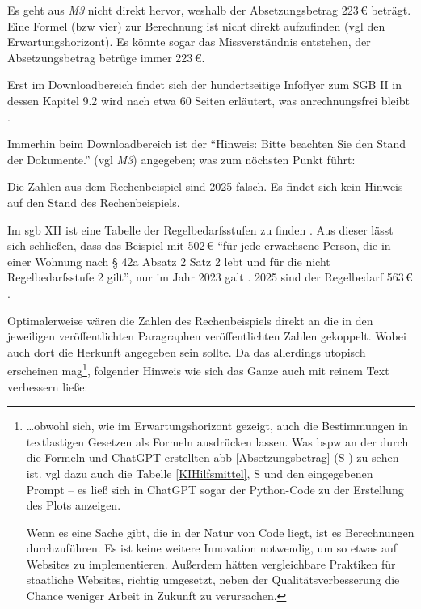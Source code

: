 \begin{myenumerate}
    \item Es geht aus \emph{M3} nicht direkt hervor, weshalb der Absetzungsbetrag 223\,€ beträgt. %
    Eine Formel (\gls{bzw} vier) zur Berechnung ist nicht direkt aufzufinden (\gls{vgl} den Erwartungshorizont). 
    Es könnte sogar das Missverständnis entstehen, der Absetzungsbetrag betrüge immer 223\,€.
    
    Erst im Downloadbereich findet sich der hundertseitige Infoflyer zum SGB II in dessen Kapitel 9.2 wird nach etwa 60 Seiten %
    erläutert, was anrechnungsfrei bleibt \autocite[59-62]{MerkblattSGBII}. 
    
    Immerhin beim Downloadbereich ist der \enquote{Hinweis: Bitte beachten Sie den Stand der Dokumente.} (\gls{vgl} \emph{M3}) angegeben; was zum nöchsten Punkt führt:
    \item Die Zahlen aus dem Rechenbeispiel sind 2025 falsch. Es findet sich kein Hinweis auf den Stand des Rechenbeispiels.
    
    Im \gls{sgb} XII ist eine Tabelle der Regelbedarfsstufen zu finden \autocite[Anlage zu §28]{Bundestag.2003}. Aus dieser lässt sich schließen, dass das Beispiel mit 502\,€ \enquote{für jede erwachsene Person, die in einer Wohnung nach § 42a Absatz 2 Satz 2 lebt und für die nicht Regelbedarfsstufe 2 gilt}, nur im Jahr 2023 galt \autocite[Anlage zu §28]{Bundestag.2003}. 2025 sind der Regelbedarf 563\,€ \autocite[Anlage zu §28]{Bundestag.2003}.

    Optimalerweise wären die Zahlen des Rechenbeispiels direkt an die in den jeweiligen veröffentlichten Paragraphen veröffentlichten Zahlen gekoppelt. Wobei auch dort die Herkunft angegeben sein sollte. Da das allerdings utopisch erscheinen mag\footnote{
        \dots obwohl sich, wie im Erwartungshorizont gezeigt, auch die Bestimmungen in textlastigen Gesetzen als Formeln ausdrücken lassen. Was \gls{bspw} an der durch die Formeln und ChatGPT erstellten \gls{abb} \ref{Absetzungsbetrag} (\gls{S} \pageref{Absetzungsbetrag}) zu sehen ist. \Gls{vgl} dazu auch die Tabelle \ref{KIHilfsmittel}, \gls{S} \pageref{KIHilfsmittel} und den eingegebenen Prompt -- es ließ sich in ChatGPT sogar der Python-Code zu der Erstellung des Plots anzeigen. 
        
        Wenn es eine Sache gibt, die in der Natur von Code liegt, ist es Berechnungen durchzuführen. Es ist keine weitere Innovation notwendig, um so etwas auf Websites zu implementieren. Außerdem hätten vergleichbare Praktiken für staatliche Websites, richtig umgesetzt, neben der Qualitätsverbesserung die Chance weniger Arbeit in Zukunft zu verursachen. 
    }, folgender Hinweis wie sich das Ganze auch mit reinem Text verbessern ließe:
    

\end{myenumerate}
